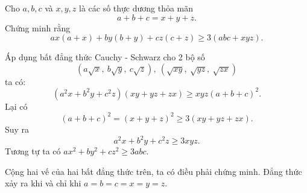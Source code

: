 \begin{problem}
	Cho $a, b, c$ và $x, y, z$ là các số thực dương thỏa mãn
	$$
	a + b + c = x + y + z.
	$$
	Chứng minh rằng
	$$
	ax(a + x) + by(b + y) + cz(c + z) \ge 3(abc + xyz).
	$$
	\solution
	
	Áp dụng bất đẳng thức Cauchy - Schwarz cho 2 bộ số 
	$$
	(a\sqrt{x},\ b\sqrt{y},\ c\sqrt{z}),\ (\sqrt{xy},\ \sqrt{yz},\ \sqrt{zx})
	$$ ta có:
	$$
		(a^2x + b^2y + c^2z)(xy + yz + zx) \ge xyz(a + b + c)^2.
	$$
	Lại có 
	$$
	(a + b + c)^2 = (x + y + z)^2 \ge 3(xy + yz + zx).
	$$
	Suy ra 
	$$a^2x + b^2y + c^2z \ge 3xyz.$$
	Tương tự ta có $ax^2 + by^2 + cz^2 \ge 3abc$.

	Cộng hai vế của hai bất đẳng thức trên, ta có điều phải chứng minh. Đẳng thức xảy ra khi và chỉ khi $a = b = c = x = y = z$.
\end{problem}
